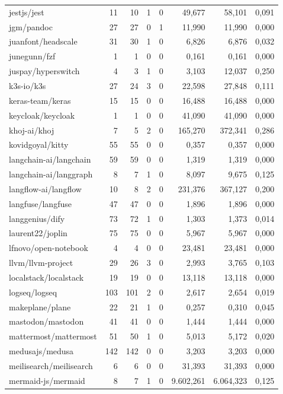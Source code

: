 \begin{tabular}{lrrrrrrr}
jestjs/jest & 11 & 10 & 1 & 0 & 49,677 & 58,101 & 0,091 \\
jgm/pandoc & 27 & 27 & 0 & 1 & 11,990 & 11,990 & 0,000 \\
juanfont/headscale & 31 & 30 & 1 & 0 & 6,826 & 6,876 & 0,032 \\
junegunn/fzf & 1 & 1 & 0 & 0 & 0,161 & 0,161 & 0,000 \\
juspay/hyperswitch & 4 & 3 & 1 & 0 & 3,103 & 12,037 & 0,250 \\
k3s-io/k3s & 27 & 24 & 3 & 0 & 22,598 & 27,848 & 0,111 \\
keras-team/keras & 15 & 15 & 0 & 0 & 16,488 & 16,488 & 0,000 \\
keycloak/keycloak & 1 & 1 & 0 & 0 & 41,090 & 41,090 & 0,000 \\
khoj-ai/khoj & 7 & 5 & 2 & 0 & 165,270 & 372,341 & 0,286 \\
kovidgoyal/kitty & 55 & 55 & 0 & 0 & 0,357 & 0,357 & 0,000 \\
langchain-ai/langchain & 59 & 59 & 0 & 0 & 1,319 & 1,319 & 0,000 \\
langchain-ai/langgraph & 8 & 7 & 1 & 0 & 8,097 & 9,675 & 0,125 \\
langflow-ai/langflow & 10 & 8 & 2 & 0 & 231,376 & 367,127 & 0,200 \\
langfuse/langfuse & 47 & 47 & 0 & 0 & 1,896 & 1,896 & 0,000 \\
langgenius/dify & 73 & 72 & 1 & 0 & 1,303 & 1,373 & 0,014 \\
laurent22/joplin & 75 & 75 & 0 & 0 & 5,967 & 5,967 & 0,000 \\
lfnovo/open-notebook & 4 & 4 & 0 & 0 & 23,481 & 23,481 & 0,000 \\
llvm/llvm-project & 29 & 26 & 3 & 0 & 2,993 & 3,765 & 0,103 \\
localstack/localstack & 19 & 19 & 0 & 0 & 13,118 & 13,118 & 0,000 \\
logseq/logseq & 103 & 101 & 2 & 0 & 2,617 & 2,654 & 0,019 \\
makeplane/plane & 22 & 21 & 1 & 0 & 0,257 & 0,310 & 0,045 \\
mastodon/mastodon & 41 & 41 & 0 & 0 & 1,444 & 1,444 & 0,000 \\
mattermost/mattermost & 51 & 50 & 1 & 0 & 5,013 & 5,172 & 0,020 \\
medusajs/medusa & 142 & 142 & 0 & 0 & 3,203 & 3,203 & 0,000 \\
meilisearch/meilisearch & 6 & 6 & 0 & 0 & 31,393 & 31,393 & 0,000 \\
mermaid-js/mermaid & 8 & 7 & 1 & 0 & 9.602,261 & 6.064,323 & 0,125 \\

\end{tabular}
